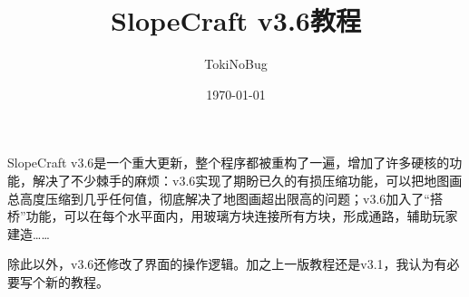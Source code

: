 \documentclass[UTF8]{ctexart}
\title{SlopeCraft v3.6教程}
\author{TokiNoBug}
\date{\today}
\begin{document}
    \maketitle
    SlopeCraft v3.6是一个重大更新，整个程序都被重构了一遍，增加了许多硬核的功能，解决了不少棘手的麻烦：v3.6实现了期盼已久的有损压缩功能，可以把地图画总高度压缩到几乎任何值，彻底解决了地图画超出限高的问题；v3.6加入了“搭桥”功能，可以在每个水平面内，用玻璃方块连接所有方块，形成通路，辅助玩家建造……
    
    除此以外，v3.6还修改了界面的操作逻辑。加之上一版教程还是v3.1，我认为有必要写个新的教程。
\end{document}
